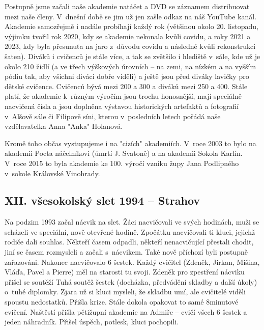 \documentclass[a5paper, 11pt, twoside]{article}
\begin{document}
Postupně jsme začali naše akademie natáčet a DVD se záznamem
distribuovat mezi naše členy. V~dnešní době se jim už jen zašle odkaz na
náš YouTube kanál. Akademie samozřejmě i nadále probíhají každý rok
(většinou okolo 20. listopadu, výjimku tvořil rok 2020, kdy se akademie
nekonala kvůli covidu, a roky 2021 a 2023, kdy byla přesunuta na jaro
z~důvodu covidu a následně kvůli rekonstrukci šaten). Diváků i cvičenců je
stále více, a tak se zvětšilo i hlediště v~sále, kde už je okolo 210
židlí (a ve třech výškových úrovních -- na zemi, na nízkém a na vyšším
pódiu tak, aby všichni diváci dobře viděli) a ještě jsou před diváky
lavičky pro dětské cvičence. Cvičenců bývá mezi 200 a 300 a diváků mezi
250 a 400. Stále platí, že akademie k~různým výročím jsou trochu
honosnější, mají speciálně nacvičená čísla a jsou doplněna výstavou
historických artefaktů a fotografií v~Alšově sále či Filipově síni,
kterou v~posledních letech pořádá naše vzdělavatelka Anna "Anka"
Holanová.

Kromě toho občas vystupujeme i na "cizích" akademiích. V~roce 2003 to
bylo na akademii Pocta náčelníkovi (úmrtí J. Svatoně) a na akademii
Sokola Karlín. V~roce 2015 to byla akademie ke 100. výročí vzniku župy
Jana Podlipného v~sokole Královské Vinohrady.

\subsection{XII. všesokolský slet 1994 --
Strahov}

Na podzim 1993 začal nácvik na slet. Žáci nacvičovali ve svých hodinách,
muži se scházeli ve speciální, nově otevřené hodině. Zpočátku
nacvičovali ti kluci, jejichž rodiče dali souhlas. Někteří časem
odpadli, někteří nenacvičující přestali chodit, jiní se časem rozmysleli
a začali s~nácvikem. Také nově příchozí byli postupně zařazováni.
Nakonec nacvičovalo 6 šestek. Každý cvičitel (Zdeněk, Jirkan, Mišina,
Vláďa, Pavel a Pierre) měl na starosti tu svoji. Zdeněk pro zpestření
nácviku přišel se soutěží Tuhá soutěž šestek (docházka, předvádění
skladby a další úkoly) o~tuhé diplomky. Zjara už si kluci mysleli, že
skladbu umí, ale cvičitelé viděli spoustu nedostatků. Přišla krize.
Stále dokola opakovat to samé 8minutové cvičení. Naštěstí přišla
pětižupní akademie na Admiře -- cvičí všech 6 šestek a jeden náhradník.
Přišel úspěch, potlesk, kluci pochopili.
\end{document}
